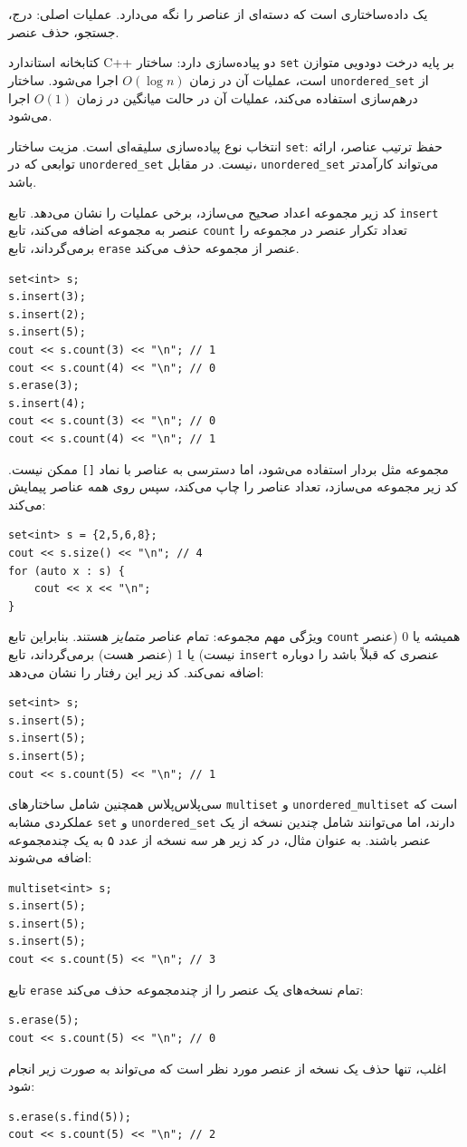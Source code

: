 یک  داده‌ساختاری است که
دسته‌ای از عناصر را نگه می‌دارد.
عملیات اصلی:
درج، جستجو، حذف عنصر.

کتابخانه استاندارد C++ دو پیاده‌سازی دارد:
ساختار \texttt{set} بر پایه درخت دودویی
متوازن است، عملیات آن در زمان $O(\log n)$ اجرا می‌شود.
ساختار \texttt{unordered\_set} از درهم‌سازی استفاده می‌کند،
عملیات آن در حالت میانگین در زمان $O(1)$ اجرا می‌شود.

انتخاب نوع پیاده‌سازی سلیقه‌ای است.
مزیت ساختار \texttt{set}:
حفظ ترتیب عناصر،
ارائه توابعی که
در \texttt{unordered\_set} نیست.
در مقابل، \texttt{unordered\_set}
می‌تواند کارآمدتر باشد.

کد زیر مجموعه اعداد صحیح
می‌سازد،
برخی عملیات را نشان می‌دهد.
تابع \texttt{insert} عنصر به مجموعه اضافه می‌کند،
تابع \texttt{count} تعداد تکرار
عنصر در مجموعه را برمی‌گرداند،
تابع \texttt{erase} عنصر از مجموعه حذف می‌کند.

\begin{lstlisting}
set<int> s;
s.insert(3);
s.insert(2);
s.insert(5);
cout << s.count(3) << "\n"; // 1
cout << s.count(4) << "\n"; // 0
s.erase(3);
s.insert(4);
cout << s.count(3) << "\n"; // 0
cout << s.count(4) << "\n"; // 1
\end{lstlisting}

مجموعه مثل بردار استفاده می‌شود،
اما دسترسی به عناصر
با نماد \texttt{[]} ممکن نیست.
کد زیر مجموعه می‌سازد،
تعداد عناصر را چاپ می‌کند، سپس
روی همه عناصر پیمایش می‌کند:
\begin{lstlisting}
set<int> s = {2,5,6,8};
cout << s.size() << "\n"; // 4
for (auto x : s) {
    cout << x << "\n";
}
\end{lstlisting}

ویژگی مهم مجموعه:
تمام عناصر \emph{متمایز} هستند.
بنابراین تابع \texttt{count} همیشه
یا 0 (عنصر نیست)
یا 1 (عنصر هست) برمی‌گرداند،
تابع \texttt{insert} عنصری که قبلاً باشد را
دوباره اضافه نمی‌کند.
کد زیر این رفتار را نشان می‌دهد:

\begin{lstlisting}
set<int> s;
s.insert(5);
s.insert(5);
s.insert(5);
cout << s.count(5) << "\n"; // 1
\end{lstlisting}

سی‌پلاس‌پلاس همچنین شامل ساختارهای
\texttt{multiset} و \texttt{unordered\_multiset}
است که عملکردی مشابه \texttt{set}
و \texttt{unordered\_set} دارند،
اما می‌توانند شامل چندین نسخه از یک عنصر باشند.
به عنوان مثال، در کد زیر هر سه نسخه از
عدد ۵ به یک چندمجموعه اضافه می‌شوند:

\begin{lstlisting}
multiset<int> s;
s.insert(5);
s.insert(5);
s.insert(5);
cout << s.count(5) << "\n"; // 3
\end{lstlisting}
تابع \texttt{erase} تمام نسخه‌های یک عنصر را
از چندمجموعه حذف می‌کند:
\begin{lstlisting}
s.erase(5);
cout << s.count(5) << "\n"; // 0
\end{lstlisting}
اغلب، تنها حذف یک نسخه از عنصر مورد نظر است
که می‌تواند به صورت زیر انجام شود:
\begin{lstlisting}
s.erase(s.find(5));
cout << s.count(5) << "\n"; // 2
\end{lstlisting}

